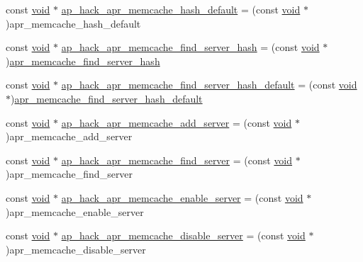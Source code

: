 \begin{DoxyCompactItemize}
\item 
const \hyperlink{group__MOD__ISAPI_gacd6cdbf73df3d9eed42fa493d9b621a6}{void} $\ast$ \hyperlink{srclib_2apr-util_2exports_8c_aa1566ba2e3ce4fc825b86d1c4f93f1d4}{ap\+\_\+hack\+\_\+apr\+\_\+memcache\+\_\+hash\+\_\+default} = (const \hyperlink{group__MOD__ISAPI_gacd6cdbf73df3d9eed42fa493d9b621a6}{void} $\ast$)apr\+\_\+memcache\+\_\+hash\+\_\+default
\item 
const \hyperlink{group__MOD__ISAPI_gacd6cdbf73df3d9eed42fa493d9b621a6}{void} $\ast$ \hyperlink{srclib_2apr-util_2exports_8c_afeec6dcef79edf719c39b499816bb1f0}{ap\+\_\+hack\+\_\+apr\+\_\+memcache\+\_\+find\+\_\+server\+\_\+hash} = (const \hyperlink{group__MOD__ISAPI_gacd6cdbf73df3d9eed42fa493d9b621a6}{void} $\ast$)\hyperlink{apr__memcache_8c_a37f48842d3bcb0bc6e171b064fa36c74}{apr\+\_\+memcache\+\_\+find\+\_\+server\+\_\+hash}
\item 
const \hyperlink{group__MOD__ISAPI_gacd6cdbf73df3d9eed42fa493d9b621a6}{void} $\ast$ \hyperlink{srclib_2apr-util_2exports_8c_a05a558d4d6ad92d8d01ce64131fe1846}{ap\+\_\+hack\+\_\+apr\+\_\+memcache\+\_\+find\+\_\+server\+\_\+hash\+\_\+default} = (const \hyperlink{group__MOD__ISAPI_gacd6cdbf73df3d9eed42fa493d9b621a6}{void} $\ast$)\hyperlink{apr__memcache_8c_ac0c55d08fa6e2c1b85221c35d97f506c}{apr\+\_\+memcache\+\_\+find\+\_\+server\+\_\+hash\+\_\+default}
\item 
const \hyperlink{group__MOD__ISAPI_gacd6cdbf73df3d9eed42fa493d9b621a6}{void} $\ast$ \hyperlink{srclib_2apr-util_2exports_8c_ada821f36aafe0b36d85f3e337676eae8}{ap\+\_\+hack\+\_\+apr\+\_\+memcache\+\_\+add\+\_\+server} = (const \hyperlink{group__MOD__ISAPI_gacd6cdbf73df3d9eed42fa493d9b621a6}{void} $\ast$)apr\+\_\+memcache\+\_\+add\+\_\+server
\item 
const \hyperlink{group__MOD__ISAPI_gacd6cdbf73df3d9eed42fa493d9b621a6}{void} $\ast$ \hyperlink{srclib_2apr-util_2exports_8c_a45048386f45cbceee5b74fb07ba2b9c4}{ap\+\_\+hack\+\_\+apr\+\_\+memcache\+\_\+find\+\_\+server} = (const \hyperlink{group__MOD__ISAPI_gacd6cdbf73df3d9eed42fa493d9b621a6}{void} $\ast$)apr\+\_\+memcache\+\_\+find\+\_\+server
\item 
const \hyperlink{group__MOD__ISAPI_gacd6cdbf73df3d9eed42fa493d9b621a6}{void} $\ast$ \hyperlink{srclib_2apr-util_2exports_8c_a5ea411ee0de1ca41d5ec90714905ca2f}{ap\+\_\+hack\+\_\+apr\+\_\+memcache\+\_\+enable\+\_\+server} = (const \hyperlink{group__MOD__ISAPI_gacd6cdbf73df3d9eed42fa493d9b621a6}{void} $\ast$)apr\+\_\+memcache\+\_\+enable\+\_\+server
\item 
const \hyperlink{group__MOD__ISAPI_gacd6cdbf73df3d9eed42fa493d9b621a6}{void} $\ast$ \hyperlink{srclib_2apr-util_2exports_8c_a6b4baf48e1705016f214e5cd87fa6803}{ap\+\_\+hack\+\_\+apr\+\_\+memcache\+\_\+disable\+\_\+server} = (const \hyperlink{group__MOD__ISAPI_gacd6cdbf73df3d9eed42fa493d9b621a6}{void} $\ast$)apr\+\_\+memcache\+\_\+disable\+\_\+server

\end{DoxyCompactItemize}
